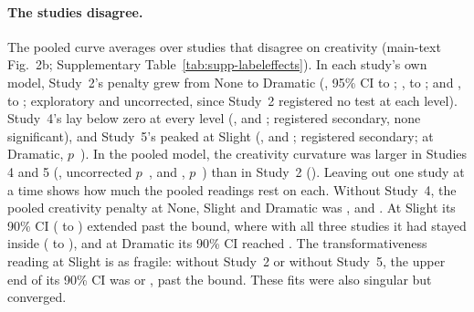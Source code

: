 \paragraph*{The studies disagree.}
The pooled curve averages over studies that disagree on creativity (main-text Fig.~2b; Supplementary Table~\ref{tab:supp-labeleffects}). In each study's own model, Study~2's penalty grew from None to Dramatic (\STwoCreatPenaltyNoneEst, 95\% CI \STwoCreatPenaltyNoneLo{} to \STwoCreatPenaltyNoneHi; \STwoCreatPenaltySlightEst, \STwoCreatPenaltySlightLo{} to \STwoCreatPenaltySlightHi; and \STwoCreatPenaltyDramaticEst, \STwoCreatPenaltyDramaticLo{} to \STwoCreatPenaltyDramaticHi; exploratory and uncorrected, since Study~2 registered no test at each level). Study~4's lay below zero at every level (\SFourCreatPenaltyNoneEst, \SFourCreatPenaltySlightEst{} and \SFourCreatPenaltyDramaticEst; registered secondary, none significant), and Study~5's peaked at Slight (\SFiveCreatPenaltyNoneEst, \SFiveCreatPenaltySlightEst{} and \SFiveCreatPenaltyDramaticEst; registered secondary; at Dramatic, $p$~\SFiveCreatPenaltyDramaticP). In the pooled model, the creativity curvature was larger in Studies 4 and 5 (\XSCreatCurvatureSFourEst, uncorrected $p$~\XSCreatCurvatureSFourP, and \XSCreatCurvatureSFiveEst, $p$~\XSCreatCurvatureSFiveP) than in Study~2 (\XSCreatCurvatureSTwoEst). Leaving out one study at a time shows how much the pooled readings rest on each. Without Study~4, the pooled creativity penalty at None, Slight and Dramatic was \XSCreatPenaltyWithoutSFourNoneEst, \XSCreatPenaltyWithoutSFourSlightEst{} and \XSCreatPenaltyWithoutSFourDramaticEst. At Slight its 90\% CI (\XSCreatPenaltyWithoutSFourSlightLoNinety{} to \XSCreatPenaltyWithoutSFourSlightHiNinety) extended past the bound, where with all three studies it had stayed inside (\XSCreatPenaltySlightLoNinety{} to \XSCreatPenaltySlightHiNinety), and at Dramatic its 90\% CI reached \XSCreatPenaltyWithoutSFourDramaticHiNinety. The transformativeness reading at Slight is as fragile: without Study~2 or without Study~5, the upper end of its 90\% CI was \XSTransPenaltyWithoutSTwoSlightHiNinety{} or \XSTransPenaltyWithoutSFiveSlightHiNinety, past the bound. These fits were also singular but converged.


